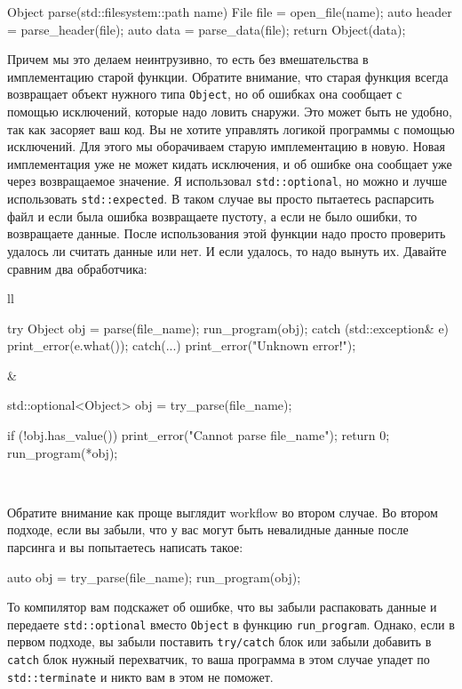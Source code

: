 \begin{enumerate}
\begin{cppcode}
Object parse(std::filesystem::path name) {
  File file = open_file(name);
  auto header = parse_header(file);
  auto data = parse_data(file);
  return Object(data);
}
\end{cppcode}
Причем мы это делаем неинтрузивно, то есть без вмешательства в имплементацию старой функции.
Обратите внимание, что старая функция всегда возвращает объект нужного типа \verb"Object", но об ошибках она сообщает с помощью исключений, которые надо ловить снаружи.
Это может быть не удобно, так как засоряет ваш код.
Вы не хотите управлять логикой программы с помощью исключений.
Для этого мы оборачиваем старую имплементацию в новую.
Новая имплементация уже не может кидать исключения, и об ошибке она сообщает уже через возвращаемое значение.
Я использовал \verb"std::optional", но можно и лучше использовать \verb"std::expected".
В таком случае вы просто пытаетесь распарсить файл и если была ошибка возвращаете пустоту, а если не было ошибки, то возвращаете данные.
После использования этой функции надо просто проверить удалось ли считать данные или нет.
И если удалось, то надо вынуть их.
Давайте сравним два обработчика:
\begin{center}
\begin{tabular}{ll}
{
\begin{minipage}[\baselineskip]{8cm}
\begin{cppcode}[numbers = none]
try {
  Object obj = parse(file_name);
  run_program(obj);
} catch (std::exception& e) {
  print_error(e.what());
} catch(...) {
  print_error("Unknown error!");
}
\end{cppcode}
\end{minipage}
}&{
\begin{minipage}[\baselineskip]{8cm}
\begin{cppcode}[numbers = none]
std::optional<Object> obj =
                   try_parse(file_name);

if (!obj.has_value()) {
  print_error("Cannot parse file_name");
  return 0;
}
run_program(*obj);
\end{cppcode}
\end{minipage}
}\\
\end{tabular}
\end{center}
Обратите внимание как проще выглядит workflow во втором случае.
Во втором подходе, если вы забыли, что у вас могут быть невалидные данные после парсинга и вы попытаетесь написать такое:
\begin{cppcode}
auto obj = try_parse(file_name);
run_program(obj);
\end{cppcode}
То компилятор вам подскажет об ошибке, что вы забыли распаковать данные и передаете \verb"std::optional" вместо \verb"Object" в функцию \verb"run_program".
Однако, если в первом подходе, вы забыли поставить \verb"try/catch" блок или забыли добавить в \verb"catch" блок нужный перехватчик, то ваша программа в этом случае упадет по \verb"std::terminate" и никто вам в этом не поможет.
\end{enumerate}

